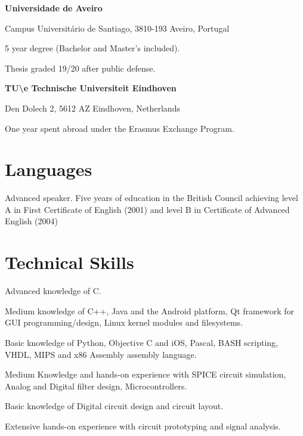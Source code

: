 
{
\textbf{Universidade de Aveiro}

Campus Universitário de Santiago, 3810-193 Aveiro, Portugal
}


{
5 year degree (Bachelor and Master's included).

Thesis graded 19/20 after public defense. 
}


\vspace{\baselineskip}


{
\textbf{TU\textbackslash e Technische Universiteit Eindhoven}

Den Dolech 2, 5612 AZ Eindhoven, Netherlands
}

{
One year spent abroad under the Erasmus Exchange Program.
}


\section*{Languages}


{
Advanced speaker. Five years of education in the British Council achieving
level A in First Certificate of English (2001) and level B in Certificate of
Advanced English (2004)
}



\section*{Technical Skills}

{
Advanced knowledge of C.
			
Medium knowledge of C++, Java and the Android platform, Qt framework for GUI
programming/design, Linux kernel modules and filesystems.
			
Basic knowledge of Python, Objective C and iOS, Pascal, BASH scripting, VHDL,
MIPS and x86 Assembly assembly language.
}

{
Medium Knowledge and hands-on experience with SPICE circuit simulation, Analog
and Digital filter design, Microcontrollers.
			 
Basic knowledge of Digital circuit design and circuit layout.

Extensive hands-on experience with circuit prototyping and signal analysis.
}

